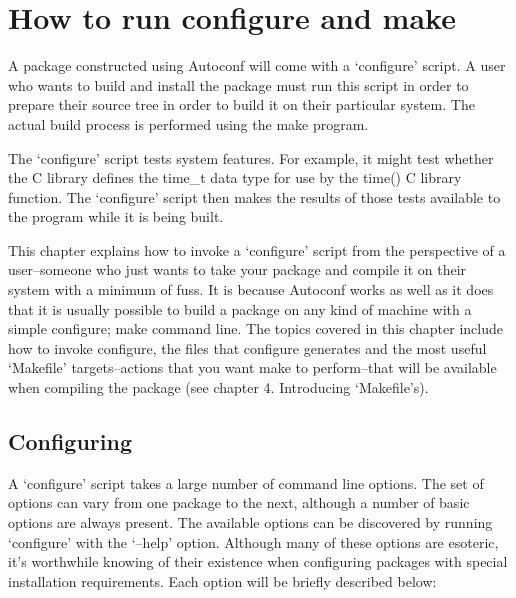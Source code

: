 \chapter{How to run configure and make}\label{C_How_to_run_configure_and_make}
A package constructed using Autoconf will come with a `configure' script. A user who wants to build and install the package must run this script in order to prepare their source tree in order to build it on their particular system. The actual build process is performed using the make program. 


The `configure' script tests system features. For example, it might test whether the C library defines the time\_{}t data type for use by the time() C library function. The `configure' script then makes the results of those tests available to the program while it is being built. 


This chapter explains how to invoke a `configure' script from the perspective of a user--someone who just wants to take your package and compile it on their system with a minimum of fuss. It is because Autoconf works as well as it does that it is usually possible to build a package on any kind of machine with a simple configure; make command line. The topics covered in this chapter include how to invoke configure, the files that configure generates and the most useful `Makefile' targets--actions that you want make to perform--that will be available when compiling the package (see chapter 4. Introducing `Makefile's).

\section{Configuring}
A `configure' script takes a large number of command line options. The set of options can vary from one package to the next, although a number of basic options are always present. The available options can be discovered by running `configure' with the `--help' option. Although many of these options are esoteric, it's worthwhile knowing of their existence when configuring packages with special installation requirements. Each option will be briefly described below: 

